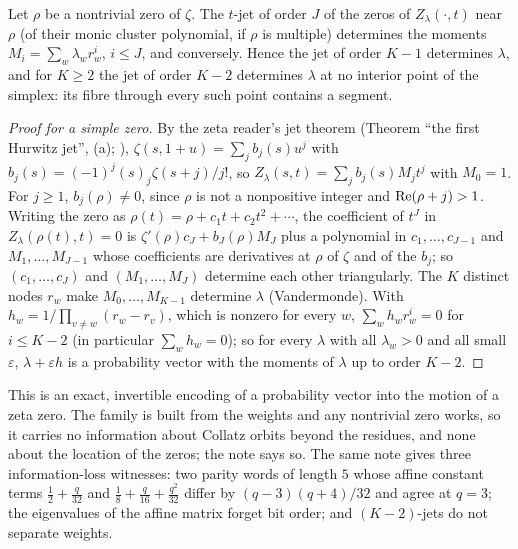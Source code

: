 \begin{theorem}\label{thm:encoding}
Let $\rho$ be a nontrivial zero of $\zeta$. The $t$-jet of order $J$ of the zeros of $Z_\lambda(\cdot,t)$ near $\rho$ (of their monic cluster polynomial, if $\rho$ is multiple) determines the moments $M_i=\sum_w\lambda_wr_w^i$, $i\le J$, and conversely. Hence the jet of order $K-1$ determines $\lambda$, and for $K\ge2$ the jet of order $K-2$ determines $\lambda$ at no interior point of the simplex: its fibre through every such point contains a segment.
\end{theorem}
\begin{proof}[Proof for a simple zero]
By the zeta reader's jet theorem (Theorem ``the first Hurwitz jet'', (a); \cite[25.11.10]{DLMF}), $\zeta(s,1+u)=\sum_jb_j(s)u^j$ with $b_j(s)=(-1)^j(s)_j\zeta(s+j)/j!$, so $Z_\lambda(s,t)=\sum_jb_j(s)M_jt^j$ with $M_0=1$. For $j\ge1$, $b_j(\rho)\ne0$, since $\rho$ is not a nonpositive integer and $\operatorname{Re}(\rho+j)>1$. Writing the zero as $\rho(t)=\rho+c_1t+c_2t^2+\cdots$, the coefficient of $t^J$ in $Z_\lambda(\rho(t),t)=0$ is $\zeta'(\rho)c_J+b_J(\rho)M_J$ plus a polynomial in $c_1,\dots,c_{J-1}$ and $M_1,\dots,M_{J-1}$ whose coefficients are derivatives at $\rho$ of $\zeta$ and of the $b_j$; so $(c_1,\dots,c_J)$ and $(M_1,\dots,M_J)$ determine each other triangularly. The $K$ distinct nodes $r_w$ make $M_0,\dots,M_{K-1}$ determine $\lambda$ (Vandermonde). With $h_w=1/\prod_{v\ne w}(r_w-r_v)$, which is nonzero for every $w$, $\sum_wh_wr_w^i=0$ for $i\le K-2$ (in particular $\sum_wh_w=0$); so for every $\lambda$ with all $\lambda_w>0$ and all small $\varepsilon$, $\lambda+\varepsilon h$ is a probability vector with the moments of $\lambda$ up to order $K-2$.
\end{proof}
This is an exact, invertible encoding of a probability vector into the motion of a zeta zero. The family is built from the weights and any nontrivial zero works, so it carries no information about Collatz orbits beyond the residues, and none about the location of the zeros; the note says so. The same note gives three information-loss witnesses: two parity words of length $5$ whose affine constant terms $\frac12+\frac q{32}$ and $\frac18+\frac q{16}+\frac{q^2}{32}$ differ by $(q-3)(q+4)/32$ and agree at $q=3$; the eigenvalues of the affine matrix forget bit order; and $(K-2)$-jets do not separate weights.

